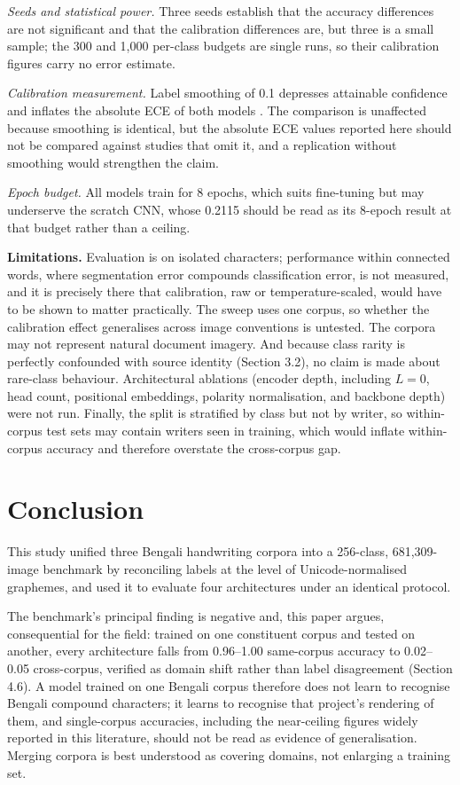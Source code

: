 \emph{Seeds and statistical power.} Three seeds establish that the
accuracy differences are not significant and that the calibration
differences are, but three is a small sample; the 300 and 1,000
per-class budgets are single runs, so their calibration figures carry no
error estimate.

\emph{Calibration measurement.} Label smoothing of 0.1 depresses
attainable confidence and inflates the absolute ECE of both models
\citep{ref56}. The
comparison is unaffected because smoothing is identical, but the
absolute ECE values reported here should not be compared against studies that omit it,
and a replication without smoothing would strengthen the claim.

\emph{Epoch budget.} All models train for 8 epochs, which suits
fine-tuning but may underserve the scratch CNN, whose 0.2115 should be
read as its 8-epoch result at that budget rather than a ceiling.

\textbf{Limitations.} Evaluation is on isolated characters; performance
within connected words, where segmentation error compounds
classification error, is not measured, and it is precisely there that calibration, raw or temperature-scaled, would have to be shown to matter practically. The sweep uses one corpus, so whether the calibration
effect generalises across image conventions is untested. The corpora may
not represent natural document imagery. And because class rarity is
perfectly confounded with source identity (Section 3.2), no
claim is made about rare-class behaviour. Architectural ablations (encoder depth, including
$L = 0$, head count, positional embeddings, polarity normalisation, and
backbone depth) were not run. Finally, the split is stratified by class but not by writer, so within-corpus test sets may contain writers seen in training, which would inflate within-corpus accuracy and therefore overstate the cross-corpus gap.


\hypertarget{conclusion}{%
\section{Conclusion}\label{conclusion}}

This study unified three Bengali handwriting corpora into a 256-class,
681,309-image benchmark by reconciling labels at the level of
Unicode-normalised graphemes, and used it to evaluate four architectures
under an identical protocol.

The benchmark's principal finding is negative and, this paper argues,
consequential for the field: trained on one constituent corpus and
tested on another, every architecture falls from 0.96--1.00 same-corpus
accuracy to 0.02--0.05 cross-corpus, verified as domain shift rather
than label disagreement (Section 4.6). A model trained on one Bengali
corpus therefore does not learn to recognise Bengali compound
characters; it learns to recognise that project's rendering of them,
and single-corpus accuracies, including the near-ceiling figures widely
reported in this literature, should not be read as evidence of
generalisation. Merging corpora is best understood as covering domains,
not enlarging a training set.

